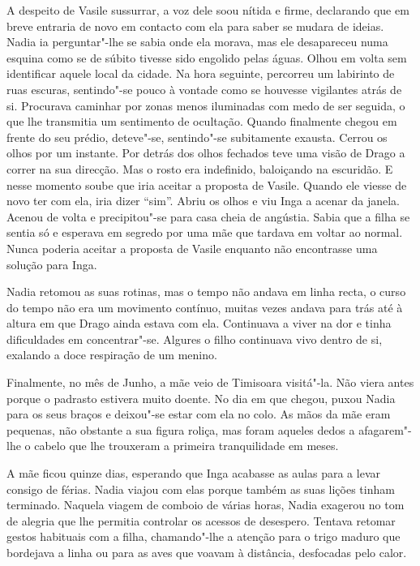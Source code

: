 A despeito de Vasile sussurrar, a voz dele soou nítida e
firme, declarando que em breve entraria de novo em contacto com ela
para saber se mudara de ideias. Nadia ia perguntar"-lhe se sabia onde ela
morava, mas ele desapareceu numa esquina como se de súbito tivesse
sido engolido pelas águas. Olhou em volta sem identificar aquele local
da cidade. Na hora seguinte, percorreu um labirinto de ruas escuras,
sentindo"-se pouco à vontade como se houvesse vigilantes atrás de si.
Procurava caminhar por zonas menos iluminadas com medo de ser seguida, o
que lhe transmitia um sentimento de ocultação. Quando finalmente
chegou em frente do seu prédio, deteve"-se, sentindo"-se subitamente exausta. Cerrou os olhos por um instante. Por detrás dos
olhos fechados teve uma visão de Drago a
correr na sua direcção. Mas o rosto era indefinido, baloiçando na
escuridão. E nesse momento soube que iria aceitar a proposta de Vasile.
Quando ele viesse de novo ter com ela, iria dizer ``sim''. Abriu os olhos
e viu Inga a acenar da janela. Acenou de volta e precipitou"-se para
casa cheia de angústia. Sabia que a filha se sentia só e esperava em
segredo por uma mãe que tardava em voltar ao normal. Nunca poderia
aceitar a proposta de Vasile enquanto não encontrasse uma solução para
Inga.

\bigskip

Nadia retomou as suas rotinas, mas o tempo não andava em linha recta, o
curso do tempo não era um movimento contínuo, muitas vezes andava para
trás até à altura em que Drago ainda estava com ela. Continuava a viver
na dor e tinha dificuldades em concentrar"-se. Algures o filho continuava
vivo dentro de si, exalando a doce respiração de um menino.

Finalmente, no mês de Junho, a mãe veio de Timisoara visitá"-la. Não
viera antes porque o padrasto estivera muito doente. No dia em que
chegou, puxou Nadia para os seus braços e deixou"-se estar com ela no
colo. As mãos da mãe eram pequenas, não obstante a sua figura roliça,
mas foram aqueles dedos a afagarem"-lhe o cabelo que lhe trouxeram a
primeira tranquilidade em meses.

A mãe ficou quinze dias, esperando que Inga acabasse as aulas para a
levar consigo de férias. Nadia viajou com elas porque também as suas
lições tinham terminado. Naquela viagem de comboio de várias horas,
Nadia exagerou no tom de alegria que lhe permitia controlar os acessos
de desespero. Tentava retomar gestos habituais
com a filha, chamando"-lhe a atenção para o trigo maduro que bordejava a
linha ou para as aves que voavam à distância, desfocadas pelo calor.

